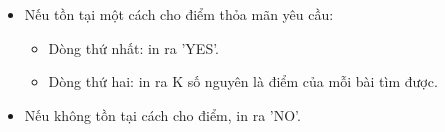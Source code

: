 \begin{itemize}
	\item Nếu tồn tại một cách cho điểm thỏa mãn yêu cầu:
\begin{itemize}
	\item Dòng thứ nhất: in ra 'YES'.
	\item Dòng thứ hai: in ra K số nguyên là điểm của mỗi bài tìm được.
\end{itemize}
	\item Nếu không tồn tại cách cho điểm, in ra 'NO'.
\end{itemize}